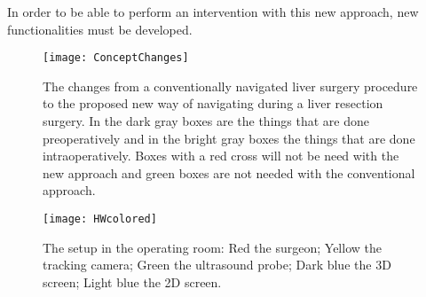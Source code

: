 In order to be able to perform an intervention with this new approach, new
functionalities must be developed.
\begin{figure}[H]
  \centering
  \texttt{[image: ConceptChanges]}
  \caption{The changes from a conventionally navigated liver surgery procedure to the
    proposed new way of navigating during a liver resection surgery. In the dark gray boxes are the things
  that are done preoperatively and in the bright gray boxes the things that are
  done intraoperatively. Boxes with
    a red cross will not be need with the new approach and green boxes are not
    needed with the conventional approach.}
  \label{fig:ConceptChanges}
\end{figure}
\begin{figure}[H]
  \centering
  \texttt{[image: HWcolored]}
  \caption{The setup in the operating room: Red the surgeon; Yellow the
    tracking camera; Green the ultrasound probe; Dark blue the 3D screen; Light
    blue the 2D screen.}
  \label{fig:HWcolored}
\end{figure}


